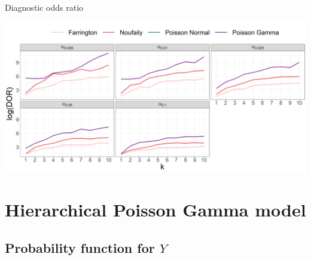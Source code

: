 \documentclass[aspectratio=169]{beamer}
\begin{document}
\begin{frame}{Diagnostic odds ratio}
\tiny

\includegraphics[width=1\linewidth]{../figures/logDOR_alpha}

\normalsize
\end{frame}

\hypertarget{hierarchical-poisson-gamma-model}{%
\section{Hierarchical Poisson Gamma
model}\label{hierarchical-poisson-gamma-model}}

\hypertarget{probability-function-for-y}{%
\subsection{\texorpdfstring{Probability function for
\(Y\)}{Probability function for Y}}\label{probability-function-for-y}}
\end{document}
